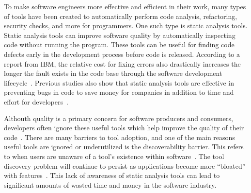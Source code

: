 \documentclass[conference]{IEEEtran}
\begin{document}
To make software engineers more effective and efficient in their work, many types of tools have been created to automatically perform code analysis, refactoring, security checks, and more for programmers. One such type is static analysis tools. Static analysis tools can improve software quality by automatically inspecting code without running the program. These tools can be useful for finding code defects early in the development process before code is released. According to a report from IBM, the relative cost for fixing errors also drastically increases the longer the fault exists in the code base through the software development lifecycle~\cite{SoftwareAssuranceSDLC}. Previous studies also show that static analysis tools are effective in preventing bugs in code to save money for companies in addition to time and effort for developers~\cite{UsingStaticAnalysis}.

Althouth quality is a primary concern for software producers and consumers, developers often ignore these useful tools which help improve the quality of their code~\cite{Johnson2013Why}. There are many barriers to tool adoption, and one of the main reasons useful tools are ignored or underutilized is the discoverability barrier. This refers to when users are unaware of a tool's existence within software~\cite{Murphy-HillScreencastingDiscovery}. The tool discovery problem will continue to persist as applications become more ``bloated'' with features~\cite{SoftwareBloat}. This lack of awareness of static analysis tools can lead to significant amounts of wasted time and money in the software industry.

%
\end{document}
